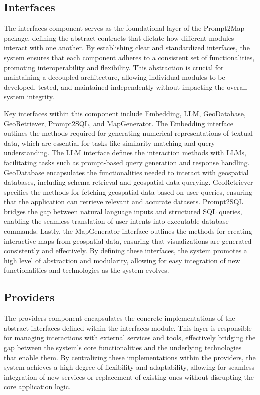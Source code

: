 \subsection{Interfaces}
The interfaces component serves as the foundational layer of the Prompt2Map package, defining the abstract contracts that dictate how different modules interact with one another. By establishing clear and standardized interfaces, the system ensures that each component adheres to a consistent set of functionalities, promoting interoperability and flexibility. This abstraction is crucial for maintaining a decoupled architecture, allowing individual modules to be developed, tested, and maintained independently without impacting the overall system integrity.

Key interfaces within this component include Embedding, LLM, GeoDatabase, GeoRetriever, Prompt2SQL, and MapGenerator. The Embedding interface outlines the methods required for generating numerical representations of textual data, which are essential for tasks like similarity matching and query understanding. The LLM interface defines the interaction methods with LLMs, facilitating tasks such as prompt-based query generation and response handling. GeoDatabase encapsulates the functionalities needed to interact with geospatial databases, including schema retrieval and geospatial data querying. GeoRetriever specifies the methods for fetching geospatial data based on user queries, ensuring that the application can retrieve relevant and accurate datasets. Prompt2SQL bridges the gap between natural language inputs and structured SQL queries, enabling the seamless translation of user intents into executable database commands. Lastly, the MapGenerator interface outlines the methods for creating interactive maps from geospatial data, ensuring that visualizations are generated consistently and effectively. By defining these interfaces, the system promotes a high level of abstraction and modularity, allowing for easy integration of new functionalities and technologies as the system evolves.

\subsection{Providers}
The providers component encapsulates the concrete implementations of the abstract interfaces defined within the interfaces module. This layer is responsible for managing interactions with external services and tools, effectively bridging the gap between the system's core functionalities and the underlying technologies that enable them. By centralizing these implementations within the providers, the system achieves a high degree of flexibility and adaptability, allowing for seamless integration of new services or replacement of existing ones without disrupting the core application logic.

